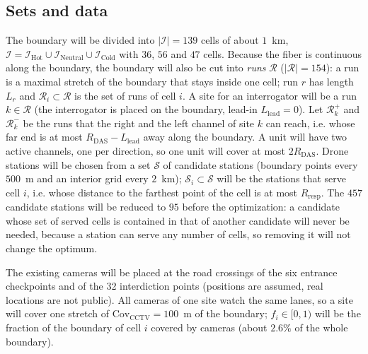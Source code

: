 \documentclass[11pt,a4paper]{article}
\begin{document}
\subsection{Sets and data}
The boundary will be divided into $|\mathcal{I}|=139$ cells of about $1$~km, $\mathcal{I}=\mathcal{I}_{\mathrm{Hot}}\cup\mathcal{I}_{\mathrm{Neutral}}\cup\mathcal{I}_{\mathrm{Cold}}$
with $36$, $56$ and $47$ cells. Because the fiber is continuous along the boundary, the boundary will also be cut into \emph{runs}
$\mathcal{R}$ ($|\mathcal{R}|=154$): a run is a maximal stretch of the boundary that stays inside one cell; run $r$ has length $L_r$ and $\mathcal{R}_i\subset\mathcal{R}$
is the set of runs of cell $i$. A site for an interrogator will be a run $k\in\mathcal{R}$ (the interrogator is placed on the boundary, lead-in $L_{\mathrm{lead}}=0$).
Let $\mathcal{R}_k^{+}$ and $\mathcal{R}_k^{-}$ be the runs that the right and the left channel of site $k$ can reach, i.e. whose far end is at most
$R_{\mathrm{DAS}}-L_{\mathrm{lead}}$ away along the boundary. A unit will have two active channels, one per direction, so one unit will cover at most $2R_{\mathrm{DAS}}$.
Drone stations will be chosen from a set $\mathcal{S}$ of candidate stations (boundary points every $500$~m and an interior grid every $2$~km); $\mathcal{S}_i\subset\mathcal{S}$ will be the
stations that serve cell $i$, i.e. whose distance to the farthest point of the cell is at most $R_{\mathrm{resp}}$.
The $457$ candidate stations will be reduced to $95$ before the optimization: a candidate whose set of served cells is contained in that of another candidate will never be needed, because a station can serve any number of cells,
so removing it will not change the optimum.

The existing cameras will be placed at the road crossings of the six entrance checkpoints and of the 32 interdiction points (positions are assumed, real locations are not public).
All cameras of one site watch the same lanes, so a site will cover one stretch of $\mathrm{Cov}_{\mathrm{CCTV}}=100$~m of the boundary; $f_i\in[0,1)$ will be the fraction of the boundary of
cell $i$ covered by cameras (about $2.6\%$ of the whole boundary).
\end{document}
